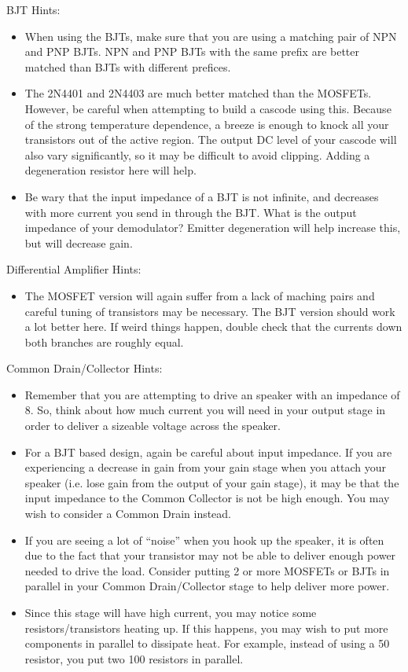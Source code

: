 \documentclass{article}
\begin{document}
BJT Hints:
\begin{itemize}
  \item When using the BJTs, make sure that you are using a matching pair of NPN and PNP BJTs. NPN and PNP BJTs with the same prefix are better matched than BJTs with different prefices.
  \item The 2N4401 and 2N4403 are much better matched than the MOSFETs. However, be careful when attempting to build a cascode using this. Because of the strong temperature dependence, a breeze is enough to knock all your transistors out of the active region. The output DC level of your cascode will also vary significantly, so it may be difficult to avoid clipping. Adding a degeneration resistor here will help.
  \item Be wary that the input impedance of a BJT is not infinite, and decreases with more current you send  in through the BJT. What is the output impedance of your demodulator? Emitter degeneration will help increase this, but will decrease gain.
\end{itemize}
Differential Amplifier Hints:
\begin{itemize}
  \item The MOSFET version will again suffer from a lack of maching pairs and careful tuning of transistors may be necessary. The BJT version should work a lot better here. If weird things happen, double check that the currents down both branches are roughly equal.
\end{itemize}
Common Drain/Collector Hints:
\begin{itemize}
  \item Remember that you are attempting to drive an speaker with an impedance of \unit{8}{\ohm}. So, think about how much current you will need in your output stage in order to deliver a sizeable voltage across the speaker.
  \item For a BJT based design, again be careful about input impedance. If you are experiencing a decrease in gain from your gain stage when you attach your speaker (i.e. lose gain from the output of your gain stage), it may be that the input impedance to the Common Collector is not be high enough. You may wish to consider a Common Drain instead.
  \item If you are seeing a lot of  ``noise'' when you hook up the speaker, it is often due to the fact that your transistor may not be able to deliver enough power needed to drive the load. Consider putting 2 or more MOSFETs or BJTs in parallel in your Common Drain/Collector stage to help deliver more power.
  \item Since this stage will have high current, you may notice some resistors/transistors heating up. If this happens, you may wish to put more components in parallel to dissipate heat. For example, instead of using a \unit{50}{\ohm} resistor, you put two \unit{100}{\ohm} resistors in parallel.
\end{itemize}
\end{document}
